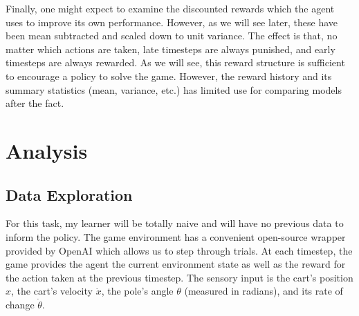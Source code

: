 \documentclass[12pt,a4paper]{article}
\begin{document}
Finally, one might expect to examine the discounted rewards which the agent uses to improve its own performance. However, as we will see later, these have been mean subtracted and scaled down to unit variance. The effect is that, no matter which actions are taken, late timesteps are always punished, and early timesteps are always rewarded. As we will see, this reward structure is sufficient to encourage a policy to solve the game. However, the reward history and its summary statistics (mean, variance, etc.) has limited use for comparing models after the fact.


\section{Analysis}
%
\subsection*{Data Exploration}

For this task, my learner will be totally naive and will have no previous data to inform the policy. The game environment has a convenient open-source wrapper provided by OpenAI which allows us to step through trials.\cite{cartpole} At each timestep, the game provides the agent the current environment state as well as the reward for the action taken at the previous timestep.  The sensory input is the cart's position $x$, the cart's velocity $\dot x$, the pole's angle $\theta$ (measured in radians), and its rate of change $\dot\theta$.\cite{state_def} 
\end{document}
